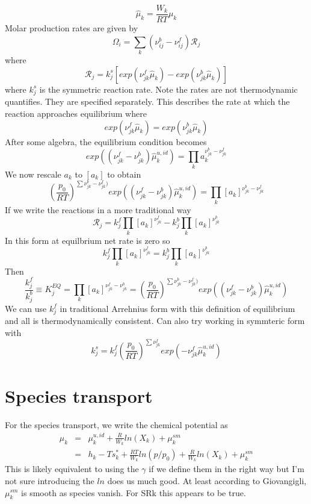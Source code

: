 \documentclass[11pt]{article}
\begin{document}
\[
\hat{\mu}_k = \frac{W_k}{R T}  \mu_k
\]
Molar production rates are given by
\[
\Omega_i = \sum_k (\nu_{ij}^b - \nu_{ij}^f) \mathcal{R}_j
\]
where 
\[
\mathcal{R}_j = k_j^s \left [ exp(\nu_{jk}^f \hat{\mu}_k) - exp ( \nu_{jk}^b \hat{\mu}_k) \right ] 
\]
where $k_j^s$ is the symmetric reaction rate.
Note the rates are not thermodynamic quantifies.  They are specified separately.
This describes the rate at which the reaction approaches equilibrium where
\[
 exp(\nu_{jk}^f \hat{\mu}_k) = exp ( \nu_{jk}^b \hat{\mu}_k) 
\]
After some algebra, the equilibrium condition becomes
\begin{equation}
 exp( (\nu_{jk}^f - \nu_{jk}^b) \hat{\mu}_k^{u,id}) = \prod_k a_k^{\nu_{jk}^b-\nu_{jk}^f}
\end{equation}
We now rescale $a_k$ to $[a_k]$ to obtain
\begin{equation}
\left ( \frac{p_0}{R T}  \right )^{\sum \nu_{jk}^b-\nu_{jk}^f) }exp( (\nu_{jk}^f - \nu_{jk}^b) \hat{\mu}_k^{u,id}) = \prod_k [a_k]^{\nu_{jk}^b-\nu_{jk}^f}
\label{eq:kin_equil_sym}
\end{equation}
If we write the reactions in a more traditional way
\begin{equation}
\mathcal{R}_j = k_j^f \prod_k [a_k]^{\nu_{jk}^f}
- k_j^b \prod_k [a_k]^{\nu_{jk}^b}
\end{equation}
In this form at equilbrium net rate is zero so
\begin{equation}
 k_j^f \prod_k [a_k]^{\nu_{jk}^f}
= k_j^b \prod_k [a_k]^{\nu_{jk}^b}
\end{equation}
Then
\begin{equation}
\frac{k_j^f}{k_j^b} \equiv K_j^{EQ} = 
\prod_k [a_k]^{\nu_{jk}^f - \nu_{jk}^b}
= 
\left ( \frac{p_0}{R T}  \right )^{\sum \nu_{jk}^b-\nu_{jk}^f) } exp( (\nu_{jk}^f - \nu_{jk}^b) \hat{\mu}_k^{u,id})
\label{eq:kin_equil_trad}
\end{equation}
We can use $k_j^f$ in traditional Arrehnius form with this definition of equilibrium and all is thermodynamically
consistent.  Can also try working in symmteric form with
\[
k_j^s =  k_j^f 
\left ( \frac{p_0}{R T}  \right )^{\sum \nu_{jk}^f }exp( -\nu_{jk}^f \hat{\mu}_k^{u,id})
\]

\section{Species transport}

For the species transport, we write the chemical potential as
\begin{eqnarray}
\mu_k &=& \mu_k^{u,id} + \frac{R}{W_k} ln(X_k)  +  \mu_k^{sm} \\
 &=& h_k - T s_k^* + \frac{R T}{W_k} ln(p/p_0) + \frac{R}{W_k} ln(X_k) + \mu_k^{sm}
\end{eqnarray}
This is likely equivalent to using the $\gamma$ if we define them in the right way but I'm not sure
introducing the $ln$ does us much good.
At least according to Giovangigli, $\mu_k^{sm}$ is smooth as species vanish.  For SRk this appears to be true.
\end{document}
